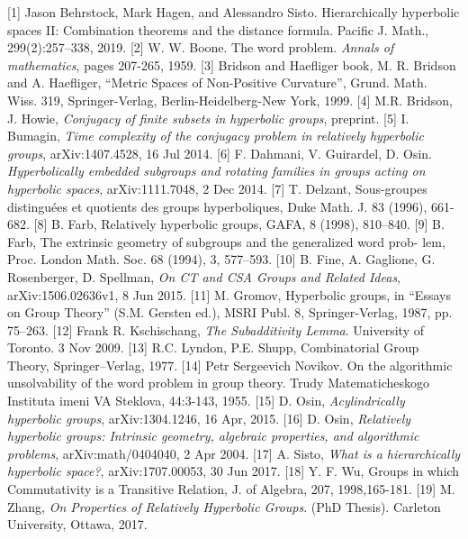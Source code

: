 \documentclass[12pt]{article}
\newcommand{\vs}{\vskip10pt}
\begin{document}
	[1] Jason Behrstock, Mark Hagen, and Alessandro Sisto. Hierarchically hyperbolic spaces II: Combination theorems and the distance formula. Pacific J. Math., 299(2):257–338, 2019.
	\vs
	[2] W. W. Boone. The word problem. \textit{Annals of mathematics}, pages 207-265, 1959.  
	\vs
	[3] Bridson and Haefliger book, M. R. Bridson and A. Haefliger, “Metric Spaces of Non-Positive Curvature”, Grund. Math. Wiss. 319, Springer-Verlag, Berlin-Heidelberg-New York, 1999.
	\vs
	[4] M.R. Bridson, J. Howie, \textit{Conjugacy of finite subsets in hyperbolic groups}, preprint. 
	\vs
	[5] I. Bumagin, \textit{Time complexity of the conjugacy problem in relatively hyperbolic groups}, arXiv:1407.4528, 16 Jul 2014. 
	\vs
	[6] F. Dahmani, V. Guirardel, D. Osin. \textit{Hyperbolically embedded subgroups and rotating families in groups acting on hyperbolic spaces}, arXiv:1111.7048, 2 Dec 2014.
	\vs
	[7] T. Delzant, Sous-groupes distinguées et quotients des groups hyperboliques, Duke Math. J. 83 (1996), 661-682.
	\vs
	[8] B. Farb, Relatively hyperbolic groups, GAFA, 8 (1998), 810–840.
	\vs
	[9] B. Farb, The extrinsic geometry of subgroups and the generalized word prob-
	lem, Proc. London Math. Soc. 68 (1994), 3, 577–593.
	\vs
	[10] B. Fine, A. Gaglione, G. Rosenberger, D. Spellman, \textit{On CT and CSA Groups and Related Ideas}, arXiv:1506.02636v1, 8 Jun 2015. 
	\vs
	[11] M. Gromov, Hyperbolic groups, in “Essays on Group Theory” (S.M. Gersten ed.), MSRI Publ. 8, Springer-Verlag, 1987, pp. 75–263.
	\vs
	[12] Frank R. Kschischang, \textit{The Subadditivity Lemma}. University of Toronto. 3 Nov 2009. 
	\vs
	[13] R.C. Lyndon, P.E. Shupp, Combinatorial Group Theory, Springer–Verlag,
	1977.
	\vs
	[14] Petr Sergeevich Novikov. On the algorithmic unsolvability of the word problem in group theory. Trudy Matematicheskogo Instituta imeni VA Steklova, 44:3-143, 1955. 
	\vs
	[15] D. Osin, \textit{Acylindrically hyperbolic groups}, arXiv:1304.1246, 16 Apr, 2015.
	\vs
	[16] D. Osin, \textit{Relatively hyperbolic groups: Intrinsic geometry, algebraic properties, and algorithmic problems}, arXiv:math/0404040, 2 Apr 2004. 
	\vs
	[17] A. Sisto, \textit{What is a hierarchically hyperbolic space?}, arXiv:1707.00053, 30 Jun 2017. 
	\vs
	[18] Y. F. Wu, Groups in which Commutativity is a Transitive Relation, J. of Algebra, 207, 1998,165-181.
	\vs
	[19] M. Zhang, \textit{On Properties of Relatively Hyperbolic Groups}. (PhD Thesis). Carleton University, Ottawa, 2017. 
	
	

	
	
	
	
	

	
	
\end{document}
